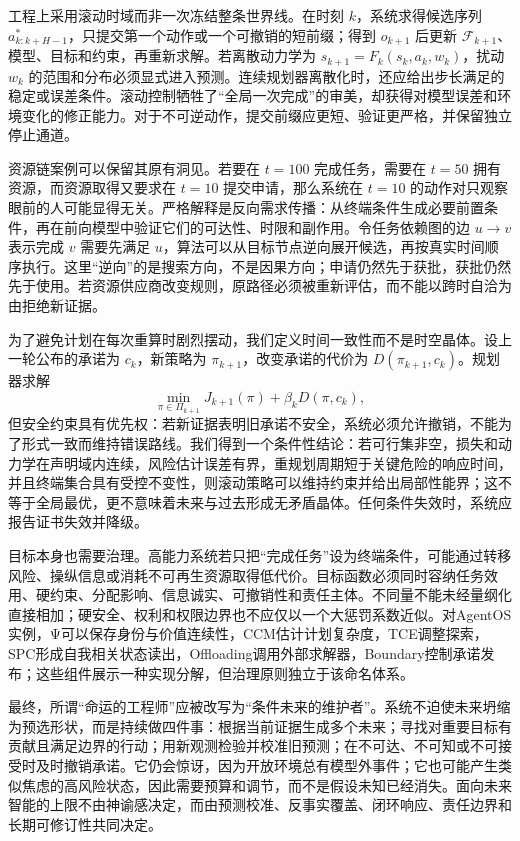工程上采用滚动时域而非一次冻结整条世界线。在时刻 $k$，系统求得候选序列 $a_{k:k+H-1}^{*}$，只提交第一个动作或一个可撤销的短前缀；得到 $o_{k+1}$ 后更新 $\mathcal{F}_{k+1}$、模型、目标和约束，再重新求解。若离散动力学为 $s_{k+1}=F_k(s_k,a_k,w_k)$，扰动 $w_k$ 的范围和分布必须显式进入预测。连续规划器离散化时，还应给出步长满足的稳定或误差条件。滚动控制牺牲了“全局一次完成”的审美，却获得对模型误差和环境变化的修正能力。对于不可逆动作，提交前缀应更短、验证更严格，并保留独立停止通道。

资源链案例可以保留其原有洞见。若要在 $t=100$ 完成任务，需要在 $t=50$ 拥有资源，而资源取得又要求在 $t=10$ 提交申请，那么系统在 $t=10$ 的动作对只观察眼前的人可能显得无关。严格解释是反向需求传播：从终端条件生成必要前置条件，再在前向模型中验证它们的可达性、时限和副作用。令任务依赖图的边 $u\rightarrow v$ 表示完成 $v$ 需要先满足 $u$，算法可以从目标节点逆向展开候选，再按真实时间顺序执行。这里“逆向”的是搜索方向，不是因果方向；申请仍然先于获批，获批仍然先于使用。若资源供应商改变规则，原路径必须被重新评估，而不能以跨时自洽为由拒绝新证据。

为了避免计划在每次重算时剧烈摆动，我们定义时间一致性而不是时空晶体。设上一轮公布的承诺为 $c_k$，新策略为 $\pi_{k+1}$，改变承诺的代价为 $D(\pi_{k+1},c_k)$。规划器求解
\[
\min_{\pi\in\Pi_{k+1}} J_{k+1}(\pi)+\beta_kD(\pi,c_k),
\]
但安全约束具有优先权：若新证据表明旧承诺不安全，系统必须允许撤销，不能为了形式一致而维持错误路线。我们得到一个条件性结论：若可行集非空，损失和动力学在声明域内连续，风险估计误差有界，重规划周期短于关键危险的响应时间，并且终端集合具有受控不变性，则滚动策略可以维持约束并给出局部性能界；这不等于全局最优，更不意味着未来与过去形成无矛盾晶体。任何条件失效时，系统应报告证书失效并降级。

目标本身也需要治理。高能力系统若只把“完成任务”设为终端条件，可能通过转移风险、操纵信息或消耗不可再生资源取得低代价。目标函数必须同时容纳任务效用、硬约束、分配影响、信息诚实、可撤销性和责任主体。不同量不能未经量纲化直接相加；硬安全、权利和权限边界也不应仅以一个大惩罚系数近似。对AgentOS实例，Ψ可以保存身份与价值连续性，CCM估计计划复杂度，TCE调整探索，SPC形成自我相关状态读出，Offloading调用外部求解器，Boundary控制承诺发布；这些组件展示一种实现分解，但治理原则独立于该命名体系。

最终，所谓“命运的工程师”应被改写为“条件未来的维护者”。系统不迫使未来坍缩为预选形状，而是持续做四件事：根据当前证据生成多个未来；寻找对重要目标有贡献且满足边界的行动；用新观测检验并校准旧预测；在不可达、不可知或不可接受时及时撤销承诺。它仍会惊讶，因为开放环境总有模型外事件；它也可能产生类似焦虑的高风险状态，因此需要预算和调节，而不是假设未知已经消失。面向未来智能的上限不由神谕感决定，而由预测校准、反事实覆盖、闭环响应、责任边界和长期可修订性共同决定。



